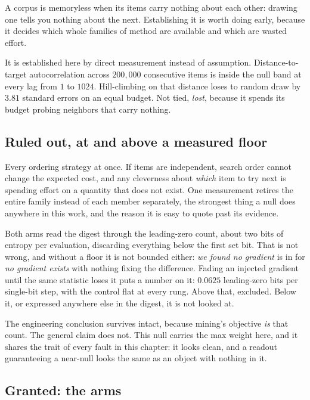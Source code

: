A corpus is memoryless when its items carry nothing about each other: drawing one tells you nothing about the next. Establishing it is worth doing early, because it decides which whole families of method are available and which are wasted effort.

It is established here by direct measurement instead of assumption. Distance-to-target autocorrelation across \(200{,}000\) consecutive items is inside the null band at every lag from \(1\) to \(1024\). Hill-climbing on that distance loses to random draw by \(3.81\) standard errors on an equal budget. Not tied, \emph{lost}, because it spends its budget probing neighbors that carry nothing.

\subsection{Ruled out, at and above a measured floor}

Every ordering strategy at once. If items are independent, search order cannot change the expected cost, and any cleverness about \emph{which} item to try next is spending effort on a quantity that does not exist. One measurement retires the entire family instead of each member separately, the strongest thing a null does anywhere in this work, and the reason it is easy to quote past its evidence.

Both arms read the digest through the leading-zero count, about two bits of entropy per evaluation, discarding everything below the first set bit. That is not wrong, and without a floor it is not bounded either: \emph{we found no gradient} is in for \emph{no gradient exists} with nothing fixing the difference. Fading an injected gradient until the same statistic loses it puts a number on it: \(0.0625\) leading-zero bits per single-bit step, with the control flat at every rung. Above that, excluded. Below it, or expressed anywhere else in the digest, it is not looked at.

The engineering conclusion survives intact, because mining's objective \emph{is} that count. The general claim does not. This null carries the max weight here, and it shares the trait of every fault in this chapter: it looks clean, and a readout guaranteeing a near-null looks the same as an object with nothing in it.

\subsection{Granted: the arms}

